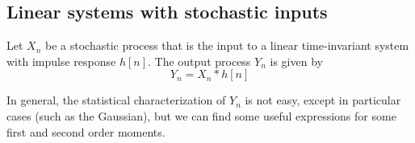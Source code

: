 %
%
%

\subsection{Linear systems with stochastic inputs}
\label{sec:SistemasEntradasStoc}

Let $X_n$ be a stochastic process that is the input to a linear time-invariant system with impulse response $h[n]$. The output process $Y_n$ is given by
\begin{equation}
Y_n = X_n \ast h[n]
\end{equation}

In general, the statistical characterization of $Y_n$ is not easy, except in particular cases (such as the Gaussian), but we can find some useful expressions for some first and second order moments.

